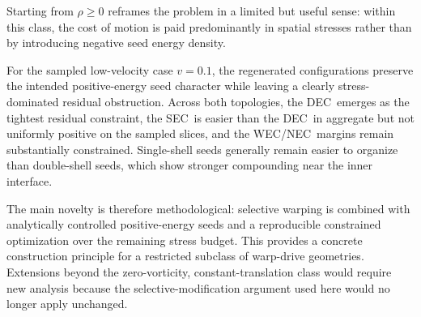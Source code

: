 \documentclass[11pt]{article}
\makeatletter
\newcommand{\@abbr}[1]{\ifmmode\mathrm{#1}\else\textsc{#1}\fi}
\newcommand{\WEC}{\@abbr{WEC}}
\newcommand{\NEC}{\@abbr{NEC}}
\newcommand{\SEC}{\@abbr{SEC}}
\newcommand{\DEC}{\@abbr{DEC}}
\makeatother
\begin{document}
Starting from $\rho\ge0$ reframes the problem in a limited but useful sense: within this class, the cost of motion is paid predominantly in spatial stresses rather than by introducing negative seed energy density.

For the sampled low-velocity case $v=0.1$, the regenerated configurations preserve the intended positive-energy seed character while leaving a clearly stress-dominated residual obstruction. Across both topologies, the \DEC\ emerges as the tightest residual constraint, the \SEC\ is easier than the \DEC\ in aggregate but not uniformly positive on the sampled slices, and the \WEC/\NEC\ margins remain substantially constrained. Single-shell seeds generally remain easier to organize than double-shell seeds, which show stronger compounding near the inner interface.

The main novelty is therefore methodological: selective warping is combined with analytically controlled positive-energy seeds and a reproducible constrained optimization over the remaining stress budget. This provides a concrete construction principle for a restricted subclass of warp-drive geometries. Extensions beyond the zero-vorticity, constant-translation class would require new analysis because the selective-modification argument used here would no longer apply unchanged.

\end{document}
